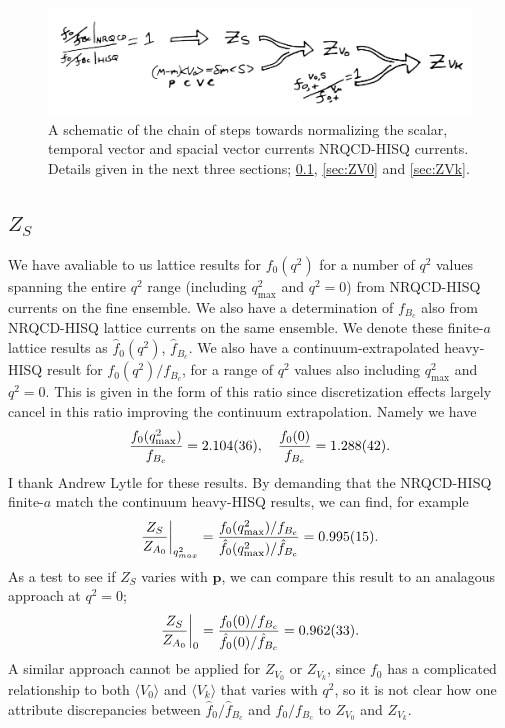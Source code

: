 \begin{figure}[htb!]
\hspace{-5pt}
    \includegraphics[width=1.0\textwidth]{images/nrqcd/normalization_chain.jpg}
  \caption{A schematic of the chain of steps towards normalizing the scalar, temporal vector and spacial vector currents NRQCD-HISQ currents. Details given in the next three sections; \ref{sec:Zs}, \ref{sec:ZV0} and \ref{sec:ZVk}. \label{fig:normalization_chain}}
\end{figure}

\subsection{$Z_S$}
\label{sec:Zs}

We have avaliable to us lattice results for $f_0(q^2)$ for a number of $q^2$ values spanning the entire $q^2$ range (including $q^2_{\text{max}}$ and $q^2=0$) from NRQCD-HISQ currents on the fine ensemble. We also have a determination of $f_{B_c}$ also from NRQCD-HISQ lattice currents on the same ensemble. We denote these finite-$a$ lattice results as $\hat{f}_0(q^2)$, $\hat{f}_{B_c}$. We also have a continuum-extrapolated heavy-HISQ result for $f_0(q^2)/f_{B_c}$, for a range of $q^2$ values also including $q^2_{\text{max}}$ and $q^2=0$. This is given in the form of this ratio since discretization effects largely cancel in this ratio improving the continuum extrapolation. Namely we have
\begin{align}
  {f_0(q^2_{\text{max}})\over f_{B_c}} = 2.104(36),\quad {f_0(0)\over f_{B_c}} = 1.288(42).
\end{align}
I thank Andrew Lytle for these results. By demanding that the NRQCD-HISQ finite-$a$ match the continuum heavy-HISQ results, we can find, for example
\begin{align}
  {Z_S \over Z_{A_0}}\bigg\vert_{q^2_{max}} = {f_0(q^2_{\text{max}})/f_{B_c}\over \hat{f}_0(q^2_{\text{max}})/\hat{f}_{B_c}} = 0.995(15).
\end{align}
As a test to see if $Z_S$ varies with ${\textbf{p}}$, we can compare this result to an analagous approach at $q^2=0$;
\begin{align}
  {Z_S \over Z_{A_0}}\bigg\vert_{0} = {f_0(0)/f_{B_c}\over \hat{f}_0(0)/\hat{f}_{B_c}} = 0.962(33).
\end{align}
A similar approach cannot be applied for $Z_{V_0}$ or $Z_{V_k}$, since $f_0$ has a complicated relationship to both $\langle V_0 \rangle$ and $\langle V_k \rangle$ that varies with $q^2$, so it is not clear how one attribute discrepancies between $\hat{f}_0/\hat{f}_{B_c}$ and $f_0/f_{B_c}$ to $Z_{V_0}$ and $Z_{V_k}$.

